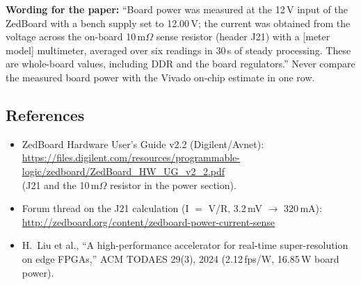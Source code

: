 \documentclass[11pt,a4paper]{article}
\begin{document}
\medskip
\textbf{Wording for the paper:} ``Board power was measured at the 12\,V input of the ZedBoard with a bench supply set to 12.00\,V; the current was obtained from the voltage across the on-board 10\,m$\Omega$ sense resistor (header J21) with a [meter model] multimeter, averaged over six readings in 30\,s of steady processing. These are whole-board values, including DDR and the board regulators.'' Never compare the measured board power with the Vivado on-chip estimate in one row.

\subsection*{References}
\begin{itemize}
  \item ZedBoard Hardware User's Guide v2.2 (Digilent/Avnet):\\ {\footnotesize\url{https://files.digilent.com/resources/programmable-logic/zedboard/ZedBoard_HW_UG_v2_2.pdf}}\\ (J21 and the 10\,m$\Omega$ resistor in the power section).
  \item Forum thread on the J21 calculation (I $=$ V/R, 3.2\,mV $\to$ 320\,mA): \url{http://zedboard.org/content/zedboard-power-current-sense}
  \item H.\ Liu et al., ``A high-performance accelerator for real-time super-resolution on edge FPGAs,'' ACM TODAES 29(3), 2024 (2.12\,fps/W, 16.85\,W board power).
\end{itemize}
\end{document}
